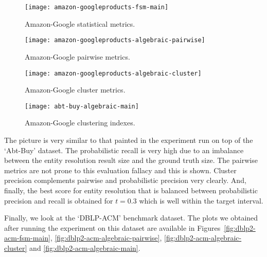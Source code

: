 \begin{figure*}[htbp]
    \begin{minipage}{0.24\textwidth}
        \centering
        \texttt{[image: amazon-googleproducts-fsm-main]}
        \caption{Amazon-Google statistical metrics.}
        \label{fig:amazon-googleproducts-fsm-main}
    \end{minipage}
    \begin{minipage}{0.24\textwidth}
        \centering
        \texttt{[image: amazon-googleproducts-algebraic-pairwise]}
        \caption{Amazon-Google pairwise metrics.}
        \label{fig:amazon-googleproducts-algebraic-pairwise}
    \end{minipage}
    \begin{minipage}{0.24\textwidth}
        \centering
        \texttt{[image: amazon-googleproducts-algebraic-cluster]}
        \caption{Amazon-Google cluster metrics.}
        \label{fig:amazon-googleproducts-algebraic-cluster}
    \end{minipage}
    \begin{minipage}{0.24\textwidth}
        \centering
        \texttt{[image: abt-buy-algebraic-main]}
        \caption{Amazon-Google clustering indexes.}
        \label{fig:amazon-googleproducts-algebraic-main}
    \end{minipage}
\end{figure*}\label{amazon-google}

The picture is very similar to that painted in the experiment run on top of the
`Abt-Buy' dataset.
The probabilistic recall is very high due to an imbalance between the entity
resolution result size and the ground truth size.
The pairwise metrics are not prone to this evaluation fallacy and this is shown.
Cluster precision complements pairwise and probabilistic precision very clearly.
And, finally, the best score for entity resolution that is balanced between
probabilistic precision and recall is obtained for $t=0.3$ which is well within
the target interval.

Finally, we look at the `DBLP-ACM' benchmark dataset.
The plots we obtained after running the experiment on this dataset are available
in Figures~\ref{fig:dblp2-acm-fsm-main},
\ref{fig:dblp2-acm-algebraic-pairwise},
\ref{fig:dblp2-acm-algebraic-cluster} and
\ref{fig:dblp2-acm-algebraic-main}.

